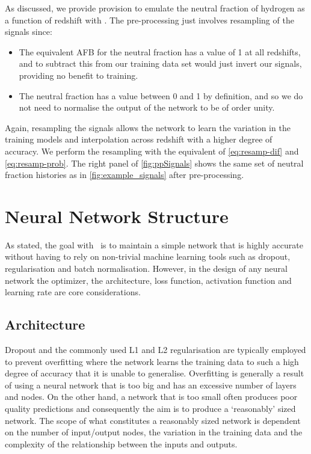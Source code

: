 As discussed, we provide provision to emulate the neutral fraction of hydrogen as a function of redshift with \name. The pre-processing just involves resampling of the signals since:
\begin{itemize}
    \item The equivalent AFB for the neutral fraction has a value of 1 at all redshifts, and to subtract this from our training data set would just invert our signals, providing no benefit to training.
    \item The neutral fraction has a value between 0 and 1 by definition, and so we do not need to normalise the output of the network to be of order unity.
\end{itemize}

Again, resampling the signals allows the network to learn the variation in the training models and interpolation across redshift with a higher degree of accuracy. We perform the resampling with the equivalent of \cref{eq:resamp-dif} and \cref{eq:resamp-prob}. The right panel of \cref{fig:ppSignals} shows the same set of neutral fraction histories as in \cref{fig:example_signals} after pre-processing.

\section{Neural Network Structure}
\label{structure}

As stated, the goal with \name~is to maintain a simple network that is highly accurate without having to rely on non-trivial machine learning tools such as dropout, regularisation and batch normalisation. However, in the design of any neural network the optimizer, the architecture, loss function, activation function and learning rate are core considerations. 

\subsection{Architecture}

Dropout \citep{Srivastava2014} and the commonly used L1 and L2 regularisation are typically employed to prevent overfitting where the network learns the training data to such a high degree of accuracy that it is unable to generalise. Overfitting is generally a result of using a neural network that is too big and has an excessive number of layers and nodes. On the other hand, a network that is too small often produces poor quality predictions and consequently the aim is to produce a `reasonably' sized network. The scope of what constitutes a reasonably sized network is dependent on the number of input/output nodes, the variation in the training data and the complexity of the relationship between the inputs and outputs.

